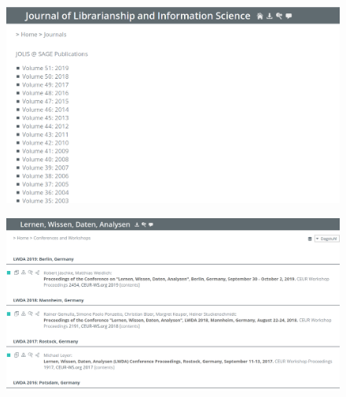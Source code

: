 \documentclass[xcolor={svgnames}]{beamer}
\makeatletter
\newcommand*{\currentname}{\@currentlabelname}
\makeatother
\begin{document}
\begin{frame}{\currentname}\linespread{1.5}
    \begin{figure}
      \begin{center}
        \includegraphics[width=\textwidth,height=0.8\textheight,keepaspectratio]{img/dblp_journal.png}
      \end{center}
    \end{figure}
\end{frame}

\begin{frame}{\currentname}\linespread{1.5}
    \begin{figure}
      \begin{center}
        \includegraphics[width=\textwidth,height=0.8\textheight,keepaspectratio]{img/dblp_conference.png}
      \end{center}
    \end{figure}
\end{frame}
\end{document}
